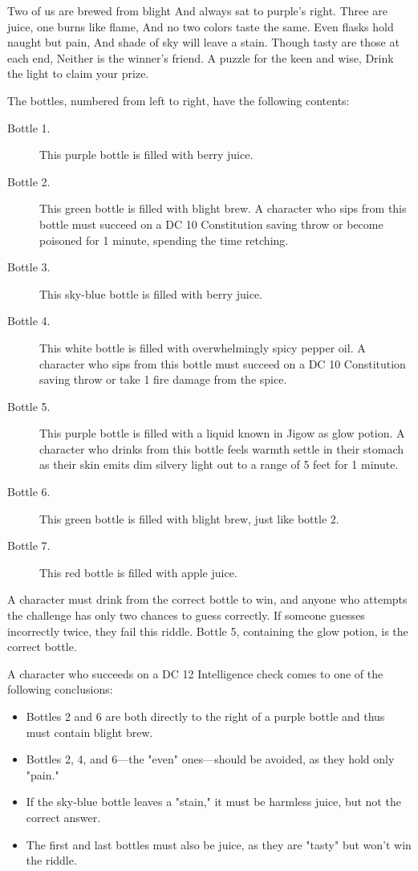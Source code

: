 \documentclass[10pt,a4paper,twoside,bg=print,twocolumn,openany,nodeprecatedcode]{dndbook}
\begin{document}
\begin{DndReadAloud}{}
Two of us are brewed from blight And always sat to purple's right. Three are juice, one burns like flame, And no two colors taste the same. Even flasks hold naught but pain, And shade of sky will leave a stain. Though tasty are those at each end, Neither is the winner's friend. A puzzle for the keen and wise, Drink the light to claim your prize.

\end{DndReadAloud}

The bottles, numbered from left to right, have the following contents:


\begin{description}
\item[Bottle 1.]
This purple bottle is filled with berry juice.
\item[Bottle 2.]
This green bottle is filled with blight brew. A character who sips from this bottle must succeed on a DC 10 Constitution saving throw or become poisoned for 1 minute, spending the time retching.
\item[Bottle 3.]
This sky-blue bottle is filled with berry juice.
\item[Bottle 4.]
This white bottle is filled with overwhelmingly spicy pepper oil. A character who sips from this bottle must succeed on a DC 10 Constitution saving throw or take 1 fire damage from the spice.
\item[Bottle 5.]
This purple bottle is filled with a liquid known in Jigow as glow potion. A character who drinks from this bottle feels warmth settle in their stomach as their skin emits dim silvery light out to a range of 5 feet for 1 minute.
\item[Bottle 6.]
This green bottle is filled with blight brew, just like bottle 2.
\item[Bottle 7.]
This red bottle is filled with apple juice.
\end{description}

A character must drink from the correct bottle to win, and anyone who attempts the challenge has only two chances to guess correctly. If someone guesses incorrectly twice, they fail this riddle. Bottle 5, containing the glow potion, is the correct bottle.

A character who succeeds on a DC 12 Intelligence check comes to one of the following conclusions:


\begin{itemize}
\item Bottles 2 and 6 are both directly to the right of a purple bottle and thus must contain blight brew.
\item Bottles 2, 4, and 6—the "even" ones—should be avoided, as they hold only "pain."
\item If the sky-blue bottle leaves a "stain," it must be harmless juice, but not the correct answer.
\item The first and last bottles must also be juice, as they are "tasty" but won't win the riddle.
\end{itemize}
\end{document}
